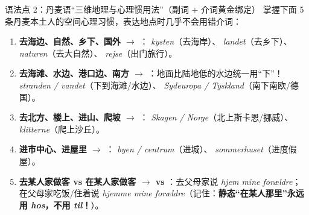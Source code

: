 \begin{grammatikbox}{语法点 2：丹麦语“三维地理与心理惯用法”（副词 + 介词黄金绑定）}
掌握下面 5 条丹麦本土人的空间心理习惯，表达地点时几乎不会用错介词：
\begin{enumerate}
  \item \textbf{去海边、自然、乡下、国外 $\rightarrow$ }：\textit{ kysten}（去海岸）、\textit{ landet}（去乡下）、\textit{ naturen}（去大自然）、\textit{ rejse}（出门旅行）。
  \item \textbf{去海滩、水边、港口边、南方 $\rightarrow$ }：地面比陆地低的水边统一用“下”！\textit{ stranden / vandet}（下到海滩/水边）、\textit{ Sydeuropa / Tyskland}（南下南欧/德国）。
  \item \textbf{去北方、楼上、进山、爬坡 $\rightarrow$ }：\textit{ Skagen / Norge}（北上斯卡恩/挪威）、\textit{ klitterne}（爬上沙丘）。
  \item \textbf{进市中心、进屋里 $\rightarrow$ }：\textit{ byen / centrum}（进城）、\textit{ sommerhuset}（进度假屋）。
  \item \textbf{去某人家做客 vs 在某人家做客 $\rightarrow$  vs }：去父母家说 \textit{hjem  mine forældre}；在父母家吃饭/住着说 \textit{hjemme  mine forældre}（记住：\textbf{静态“在某人那里”永远用 \textit{hos}，不用 \textit{til}！}）。
\end{enumerate}
\end{grammatikbox}



